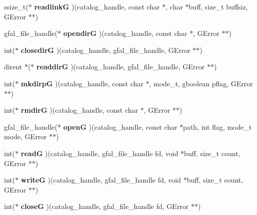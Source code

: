 \begin{CompactItemize}
\item 
ssize\_\-t($\ast$ \textbf{readlink\-G} )(catalog\_\-handle, const char $\ast$, char $\ast$buff, size\_\-t buffsiz, GError $\ast$$\ast$)\label{struct__gfal__catalog__interface_7ff4623ecf8fd8c5cd5055c20506b5c5}

\item 
gfal\_\-file\_\-handle($\ast$ \textbf{opendir\-G} )(catalog\_\-handle, const char $\ast$, GError $\ast$$\ast$)\label{struct__gfal__catalog__interface_74779ad5f9b964d6de25aa8968654b6f}

\item 
int($\ast$ \textbf{closedir\-G} )(catalog\_\-handle, gfal\_\-file\_\-handle, GError $\ast$$\ast$)\label{struct__gfal__catalog__interface_110fb04c3d951be3d863f8976076f6a0}

\item 
dirent $\ast$($\ast$ \textbf{readdir\-G} )(catalog\_\-handle, gfal\_\-file\_\-handle, GError $\ast$$\ast$)\label{struct__gfal__catalog__interface_d8223fb7b6916160c58777204cf44166}

\item 
int($\ast$ \textbf{mkdirp\-G} )(catalog\_\-handle, const char $\ast$, mode\_\-t, gboolean pflag, GError $\ast$$\ast$)\label{struct__gfal__catalog__interface_929e31cec058fd3af2b35925d138fce4}

\item 
int($\ast$ \textbf{rmdir\-G} )(catalog\_\-handle, const char $\ast$, GError $\ast$$\ast$)\label{struct__gfal__catalog__interface_bcfed6ce5edc988e207fdedce2249ca4}

\item 
gfal\_\-file\_\-handle($\ast$ \textbf{open\-G} )(catalog\_\-handle, const char $\ast$path, int flag, mode\_\-t mode, GError $\ast$$\ast$)\label{struct__gfal__catalog__interface_f13314d48d829c5a00688e53798740d6}

\item 
int($\ast$ \textbf{read\-G} )(catalog\_\-handle, gfal\_\-file\_\-handle fd, void $\ast$buff, size\_\-t count, GError $\ast$$\ast$)\label{struct__gfal__catalog__interface_06de34e63362030b21d7c543e2098a6e}

\item 
int($\ast$ \textbf{write\-G} )(catalog\_\-handle, gfal\_\-file\_\-handle fd, void $\ast$buff, size\_\-t count, GError $\ast$$\ast$)\label{struct__gfal__catalog__interface_6b6ac4cdc442e6682aa75a65e2f01094}

\item 
int($\ast$ \textbf{close\-G} )(catalog\_\-handle, gfal\_\-file\_\-handle fd, GError $\ast$$\ast$)\label{struct__gfal__catalog__interface_01f3c7263f9650b83328df65821a7fe8}


\end{CompactItemize}
